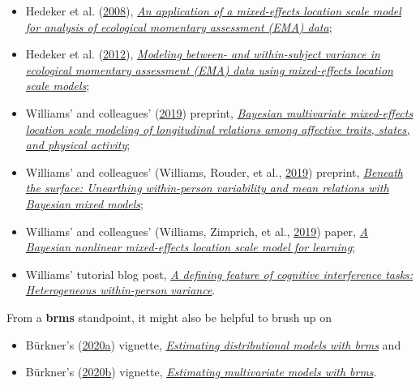 \documentclass[]{article}
\providecommand{\tightlist}{%
  \setlength{\itemsep}{0pt}\setlength{\parskip}{0pt}}
\begin{document}
\begin{itemize}
\tightlist
\item
  Hedeker et al.
  (\protect\hyperlink{ref-hedekerApplicationMixedeffectsLocation2008}{2008}),
  \href{https://www.ncbi.nlm.nih.gov/pmc/articles/PMC2424261/}{\emph{An
  application of a mixed-effects location scale model for analysis of
  ecological momentary assessment (EMA) data}};
\item
  Hedeker et al.
  (\protect\hyperlink{ref-hedekerModelingWithinsubjectVariance2012}{2012}),
  \href{https://www.ncbi.nlm.nih.gov/pmc/articles/PMC3655706/}{\emph{Modeling
  between- and within-subject variance in ecological momentary
  assessment (EMA) data using mixed-effects location scale models}};
\item
  Williams' and colleagues'
  (\protect\hyperlink{ref-williamsBayesianMultivariateMixedeffects2019a}{2019})
  preprint, \href{https://psyarxiv.com/4kfjp/}{\emph{Bayesian
  multivariate mixed-effects location scale modeling of longitudinal
  relations among affective traits, states, and physical activity}};
\item
  Williams' and colleagues' (Williams, Rouder, et al.,
  \protect\hyperlink{ref-williamsSurfaceUnearthingWithinperson2019}{2019})
  preprint, \href{https://osf.io/gwatq}{\emph{Beneath the surface:
  Unearthing within-person variability and mean relations with Bayesian
  mixed models}};
\item
  Williams' and colleagues' (Williams, Zimprich, et al.,
  \protect\hyperlink{ref-williamsBayesianNonlinearMixedeffects2019a}{2019})
  paper, \href{https://doi.org/10.3758/s13428-019-01255-9}{\emph{A
  Bayesian nonlinear mixed-effects location scale model for learning}};
\item
  Williams' tutorial blog post,
  \href{https://donaldrwilliams.github.io/2020/04/04/a-defining-feature-of-cognitive-interference-tasks-heterogeneous-within-person-variance/}{\emph{A
  defining feature of cognitive interference tasks: Heterogeneous
  within-person variance}}.
\end{itemize}

From a \textbf{brms} standpoint, it might also be helpful to brush up on

\begin{itemize}
\tightlist
\item
  Bürkner's
  (\protect\hyperlink{ref-Buxfcrkner2020Distributional}{2020}\protect\hyperlink{ref-Buxfcrkner2020Distributional}{a})
  vignette,
  \href{https://CRAN.R-project.org/package=brms/vignettes/brms_distreg.html}{\emph{Estimating
  distributional models with brms}} and
\item
  Bürkner's
  (\protect\hyperlink{ref-Buxfcrkner2020Multivariate}{2020}\protect\hyperlink{ref-Buxfcrkner2020Multivariate}{b})
  vignette,
  \href{https://CRAN.R-project.org/package=brms/vignettes/brms_multivariate.html}{\emph{Estimating
  multivariate models with brms}}.
\end{itemize}
\end{document}
